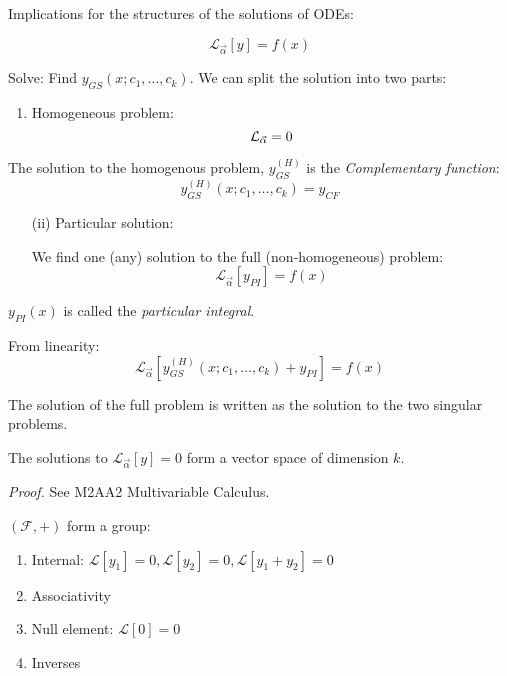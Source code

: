 \documentclass[twoside]{scrartcl}
\begin{document}
Implications for the structures of the solutions of ODEs:

\[\mathcal{L}_{\vec{\alpha}}[y] = f(x)\]

Solve: Find $y_{GS}(x; c_1,\dots,c_k)$. We can split the solution into two parts: 

\begin{enumerate}
  \item Homogeneous problem: 
  \[\mathcal{L}_{\vec{\alpha}} = 0\vspace*{-5pt}\]
    \end{enumerate}\vspace*{5pt}
    
    \begin{definition}
  The solution to the homogenous problem, $y_{GS}^{(H)}$ is the \emph{Complementary function}: 	
    \[y_{GS}^{(H)}(x;c_1,\dots,c_k) = y_{CF}\]
  \end{definition}\vspace*{5pt}


\begin{enumerate}
  \item[(ii)] Particular solution: 
  
  We find one (any) solution to the full (non-homogeneous) problem:
    \[\mathcal{L}_{\vec{\alpha}}[y_{PI}] = f(x)\]
    
\end{enumerate}  

    
\begin{definition}
  $y_{PI}(x)$ is called the \emph{particular integral}.
  \end{definition}
 
  From linearity: 
  \[\mathcal{L}_{\vec{\alpha}}[y_{GS}^{(H)}(x;c_1,\dots,c_k)+y_{PI}] = f(x)\]
  
  The solution of the full problem is written as the solution to the two singular problems. 

\begin{theorem}
The solutions to $\mathcal{L}_{\vec{\alpha}}[y]=0$ form a vector space of dimension $k$. 	
\end{theorem}
\textit{Proof.} See M2AA2 Multivariable Calculus. 

$(\mathcal{F}, +)$ form a group:
\begin{enumerate}
  \item Internal: $\mathcal{L}[y_1] = 0, \mathcal{L}[y_2] = 0, \mathcal{L}[y_1 + y_2] = 0$
  \item Associativity
  \item Null element: $\mathcal{L}[0] = 0$
  \item Inverses
\end{enumerate}~
\end{document}
